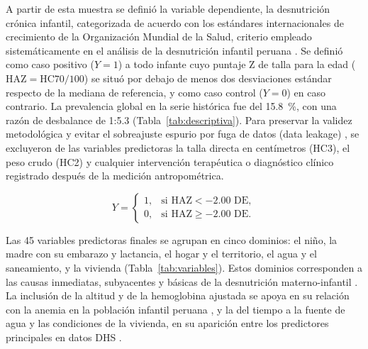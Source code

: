 \documentclass[final,5p,times,twocolumn,authoryear,lefttitle]{elsarticle}
\begin{document}
A partir de esta muestra se definió la variable dependiente, la desnutrición crónica infantil, categorizada de acuerdo con los estándares internacionales de crecimiento de la Organización Mundial de la Salud, criterio empleado sistemáticamente en el análisis de la desnutrición infantil peruana \citep{sobrino2014peru,santos2021peru}. Se definió como caso positivo ($Y=1$) a todo infante cuyo puntaje Z de talla para la edad ($\mathrm{HAZ}=\mathrm{HC70}/100$) se situó por debajo de menos dos desviaciones estándar respecto de la mediana de referencia, y como caso control ($Y=0$) en caso contrario. La prevalencia global en la serie histórica fue del 15.8~\%, con una razón de desbalance de 1:5.3 (Tabla~\ref{tab:descriptiva}). Para preservar la validez metodológica y evitar el sobreajuste espurio por fuga de datos (data leakage) \citep{kaufman2011leakage}, se excluyeron de las variables predictoras la talla directa en centímetros (HC3), el peso crudo (HC2) y cualquier intervención terapéutica o diagnóstico clínico registrado después de la medición antropométrica.

\begin{equation}
Y =
\begin{cases}
1, & \text{si } \mathrm{HAZ} < -2.00\text{ DE},\\
0, & \text{si } \mathrm{HAZ} \geq -2.00\text{ DE}.
\end{cases}
\label{eq:variable_objetivo}
\end{equation}

Las 45 variables predictoras finales se agrupan en cinco dominios: el niño, la madre con su embarazo y lactancia, el hogar y el territorio, el agua y el saneamiento, y la vivienda (Tabla~\ref{tab:variables}). Estos dominios corresponden a las causas inmediatas, subyacentes y básicas de la desnutrición materno-infantil \citep{black2013lancet,victora2021lancet}. La inclusión de la altitud y de la hemoglobina ajustada se apoya en su relación con la anemia en la población infantil peruana \citep{accinelli2020anemia}, y la del tiempo a la fuente de agua y las condiciones de la vivienda, en su aparición entre los predictores principales en datos DHS \citep{bitew2021ethiopia}.
\end{document}
